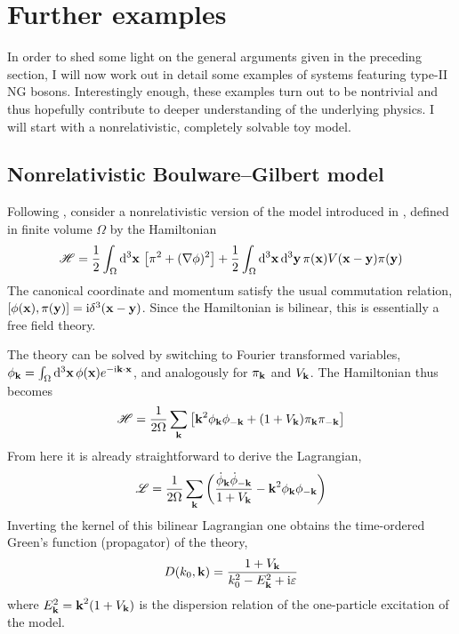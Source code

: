 \documentclass[final,2p,times,12pt,sort&compress]{elsarticle}
\newcommand\Ham{\mathscr{H}}                %
\newcommand\Lag{\mathscr{L}}                %
\newcommand\vek[1]{{\boldsymbol{\bf #1}}}   %
\newcommand\skal[2]{\vek{#1}\cdot\vek{#2}}  %
\newcommand\imag{\mathrm i}                 %
\newcommand\ve{\varepsilon}
\newcommand\dthree{\mathop{{\rm d}^3\!}\nolimits} %
\begin{document}

\section{Further examples}
\label{sec:examples}
In order to shed some light on the general arguments given in the preceding
section, I will now work out in detail some examples of systems featuring
type-II NG bosons. Interestingly enough, these examples turn out to be
nontrivial and thus hopefully contribute to deeper understanding of the
underlying physics. I will start with a nonrelativistic, completely solvable
toy model.


\subsection{Nonrelativistic Boulware--Gilbert model}
\label{subsec:boulware}
Following \cite{Guralnik:1968gu}, consider a nonrelativistic version of the
model introduced in \cite{Boulware:1962zz}, defined in finite volume $\Omega$
by the Hamiltonian
\begin{equation}
\Ham=\frac12\int_\Omega\dthree\vek x\,\left[\pi^2+(\nabla\phi)^2\right]+
\frac1{2}\int_\Omega\dthree\vek x\dthree\vek y\,\pi(\vek x)V(\vek x-\vek
y)\pi(\vek y)
\end{equation}
The canonical coordinate and momentum satisfy the usual commutation relation,
$[\phi(\vek x),\pi(\vek y)]=\imag\delta^3(\vek x-\vek y)$. Since the
Hamiltonian is bilinear, this is essentially a free field theory.

The theory can be solved by switching to Fourier transformed variables,
$\phi_{\vek k}=\int_\Omega\dthree\vek x\,\phi(\vek x)e^{-\imag\skal kx}$, and
analogously for $\pi_{\vek k}$ and $V_{\vek k}$. The Hamiltonian thus becomes
\begin{equation}
\Ham=\frac1{2\Omega}\sum_{\vek k}\left[\vek k^2\phi_{\vek k}\phi_{-\vek k}+
(1+V_{\vek k})\pi_{\vek k}\pi_{-\vek k}\right]
\label{HamFT}
\end{equation}
From here it is already straightforward to derive the Lagrangian,
\begin{equation}
\Lag=\frac1{2\Omega}\sum_{\vek k}\left(\frac{\dot\phi_{\vek k}\dot\phi_{-\vek
k}}{1+V_{\vek k}}-\vek k^2\phi_{\vek k}\phi_{-\vek k}\right)
\label{Boulware_Lagrangian}
\end{equation}
Inverting the kernel of this bilinear Lagrangian one obtains the
time-ordered Green's function (propagator) of the theory,
\begin{equation}
D(k_0,\vek k)=\frac{1+V_{\vek k}}{k_0^2-E_{\vek k}^2+\imag\ve}
\end{equation}
where $E_{\vek k}^2=\vek k^2(1+V_{\vek k})$ is the dispersion relation of the
one-particle excitation of the model.
\end{document}
